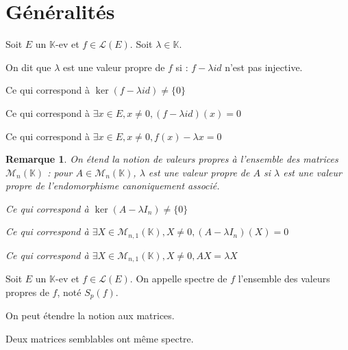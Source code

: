 \documentclass[a4paper,12pt]{book}
\newcommand{\Def}[2]{\begin{tcolorbox}[sharp corners, colback=white,colframe=blue!90!black!75, title=Définition : #1]#2\end{tcolorbox}}
\newcommand{\Prop}[2]{\begin{tcolorbox}[sharp corners, colback=white,colframe=red!90!black!75, title=Proposition : #1]#2\end{tcolorbox}}
\newtheorem{Rem}{Remarque}[section]
\def\K{\mathbb{K}}
\begin{document}
\section{Généralités}
\Def{Valeur propre}{Soit $E$ un $\K$-ev et $f\in\mathcal{L}(E)$. Soit $\lambda \in\K$. \par On dit que $\lambda$ est une valeur propre de $f$ si : $f-\lambda id$ n'est pas injective. \par Ce qui correspond à $\ker (f-\lambda id)\neq\{0\}$ \par Ce qui correspond à $\exists x\in E, x\neq 0, (f-\lambda id)(x)=0$ \par Ce qui correspond à $\exists x\in E,x\neq 0, f(x)-\lambda x=0$}
\begin{Rem}
On étend la notion de valeurs propres à l'ensemble des matrices $\mathcal{M}_n(\K)$ : pour $A\in\mathcal{M}_n(\K)$, $\lambda$ est une valeur propre de $A$ si $\lambda$ est une valeur propre de l'endomorphisme canoniquement associé. \par Ce qui correspond à $\ker (A-\lambda I_n) \neq \{0\}$ \par Ce qui correspond à $\exists X\in\mathcal{M}_{n,1}(\K), X\neq 0, (A-\lambda I_n)(X) = 0$ \par Ce qui correspond à $\exists X\in\mathcal{M}_{n,1}(\K), X\neq 0, AX=\lambda X$
\end{Rem}
\Def{Spectre d'un endomorphisme}{Soit $E$ un $\K$-ev et $f\in \mathcal{L}(E)$. On appelle spectre de $f$ l'ensemble des valeurs propres de $f$, noté $S_p(f)$. \par On peut étendre la notion aux matrices.}
\Prop{}{Deux matrices semblables ont même spectre.}
\end{document}

